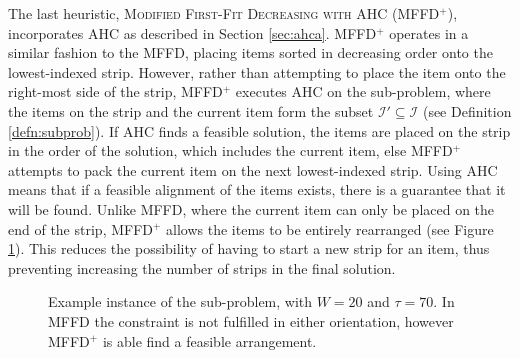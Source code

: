 \documentclass[oribibl]{llncs}
\begin{document}
The last heuristic, \textsc{Modified First-Fit Decreasing with AHC} (MFFD$^+$), incorporates AHC as described in Section \ref{sec:ahca}. MFFD$^+$ operates in a similar fashion to the MFFD, placing items sorted in decreasing order onto the lowest-indexed strip. However, rather than attempting to place the item onto the right-most side of the strip, MFFD$^+$ executes AHC on the sub-problem, where the items on the strip and the current item form the subset $\mathcal{I}' \subseteq \mathcal{I}$ (see Definition \ref{defn:subprob}). If AHC finds a feasible solution, the items are placed on the strip in the order of the solution, which includes the current item, else MFFD$^+$ attempts to pack the current item on the next lowest-indexed strip. Using AHC means that if a feasible alignment of the items exists, there is a guarantee that it will be found. Unlike MFFD, where the current item can only be placed on the end of the strip, MFFD$^+$ allows the items to be entirely rearranged (see Figure \ref{fig:comparestrips}). This reduces the possibility of having to start a new strip for an item, thus preventing increasing the number of strips in the final solution. 

\begin{figure}[H]	
	\centering
	
	\caption{Example instance of the sub-problem, with $W = 20$ and $\tau = 70$. In MFFD the constraint is not fulfilled in either orientation, however MFFD$^+$ is able find a feasible arrangement.}	
	\label{fig:comparestrips}
\end{figure}
\end{document}
